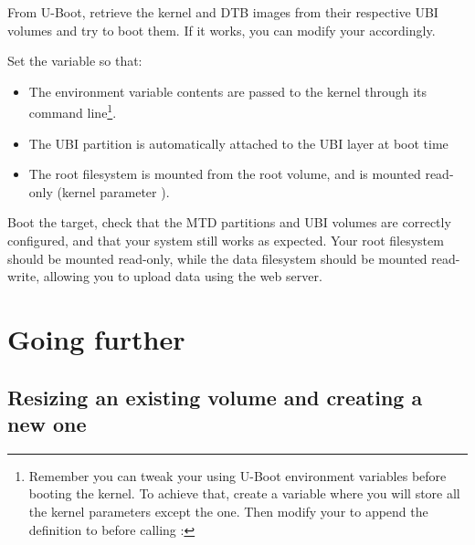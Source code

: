 From U-Boot, retrieve the kernel and DTB images from their respective
UBI volumes and try to boot them. If it works, you can modify your
 accordingly.

Set the  variable so that:

\begin{itemize}
\item The  environment variable contents are passed to
  the kernel through its command line\footnote{Remember you can tweak your
   using U-Boot environment variables before booting the kernel.
  To achieve that, create a  variable where you
  will store all the kernel parameters except the 
  one. Then modify your  to append the 
  definition to  before calling :
  }.
\item The UBI partition is automatically attached to the UBI layer at
  boot time
\item The root filesystem is mounted from the root volume, and is mounted
  read-only (kernel parameter ).
\end{itemize}

Boot the target, check that the MTD partitions and UBI volumes are
correctly configured, and that your system still works as
expected. Your root filesystem should be mounted read-only, while the
data filesystem should be mounted read-write, allowing you to upload
data using the web server.


\section{Going further}

\subsection{Resizing an existing volume and creating a new one}

